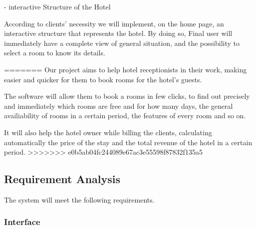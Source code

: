  
	- interactive Structure of the Hotel 
	
	According to clients’ necessity we will implement, on the home page, an interactive structure that represents the hotel. By doing so, Final user will immediately have a complete view of general situation, and the possibility to select a room to know its details.

=======
Our project aims to help hotel receptionists in their work, making easier and quicker for them to book rooms for the hotel's guests. 

The software will allow them to book a rooms in few clicks, to find out precisely and immediately which rooms are free and for how many days, the general availiability of rooms in a certain period, the features of every room and so on. 

It will also help the hotel owner while billing the clients, calculating automatically the price of the stay and the total revenue of the hotel in a certain period.
>>>>>>> e0b5ab04fc244089e67ac3e55598f87832f135a5


\subsection{Requirement Analysis}

The system will meet the following requirements.

\subsubsection{Interface}

